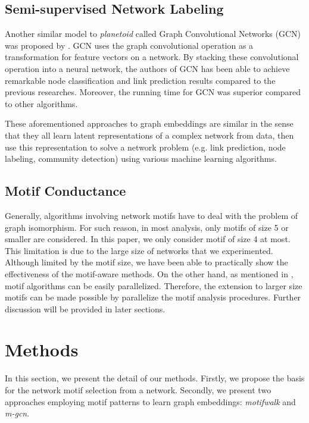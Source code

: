 \documentclass{article}
\theoremstyle{definition}
\begin{document}
\subsection{Semi-supervised Network Labeling}

Another similar model to \emph{planetoid} called Graph Convolutional 
Networks (GCN) 
was proposed by \citeauthor{gcn}. GCN uses the graph convolutional
operation as a transformation for feature vectors on a network. By stacking
these convolutional operation into a neural network, the authors of
GCN has been able to achieve remarkable node classification and link
prediction results compared to the previous researches. Moreover, the
running time for GCN was superior compared to other algorithms.


These aforementioned approaches to graph embeddings
are similar in the sense that they all learn latent representations
of a complex network from data, then use this representation to solve 
a network problem (e.g. link prediction, node labeling, community
detection) using various machine learning algorithms.

\subsection{Motif Conductance}



Generally, algorithms involving network motifs have to deal with
the problem of graph isomorphism. For such reason, in most analysis,
only motifs of size 5 or smaller are considered. In this paper,
we only consider motif of size 4 at most. This limitation is due to
the large size of networks that we experimented. Although limited 
by the motif size, we have been able to practically show the 
effectiveness of the motif-aware methods. On the other hand, as mentioned 
in \cite{juremotif},
motif algorithms can be easily parallelized. Therefore, the extension to
larger size motifs can be made possible by parallelize the motif
analysis procedures. Further discussion will be provided in later 
sections.

\section{Methods}

In this section, we present the detail of our methods. Firstly,
we propose the basis for the network motif selection from a network.
Secondly, we present two approaches employing motif patterns to
learn graph embeddings: \emph{motifwalk} and \emph{m-gcn}.
\end{document}

